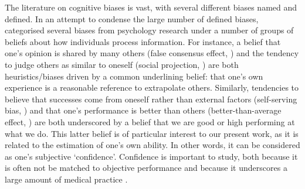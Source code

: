 \documentclass[a4paper, nobind]{templates/ociamthesis}
\begin{document}
\hfill\break
The literature on cognitive biases is vast, with several different biases named and defined. In an attempt to condense the large number of defined biases, \textcite{oeberst_toward_2023} categorised several biases from psychology research under a number of groups of beliefs about how individuals process information. For instance, a belief that one's opinion is shared by many others (false consensus effect, \textcite{nickerson_how_1999}) and the tendency to judge others as similar to oneself (social projection, \textcite{robbins_social_2005}) are both heuristics/biases driven by a common underlining belief: that one's own experience is a reasonable reference to extrapolate others. Similarly, tendencies to believe that successes come from oneself rather than external factors (self-serving bias, \textcite{mullen_self-serving_1988}) and that one's performance is better than others (better-than-average effect, \textcite{alicke_better-than-average_2005}) are both underscored by a belief that we are good or high performing at what we do. This latter belief is of particular interest to our present work, as it is related to the estimation of one's own ability. In other words, it can be considered as one's subjective `confidence'. Confidence is important to study, both because it is often not be matched to objective performance and because it underscores a large amount of medical practice \autocite{croskerry2008,berner_overconfidence_2008}.
\end{document}
